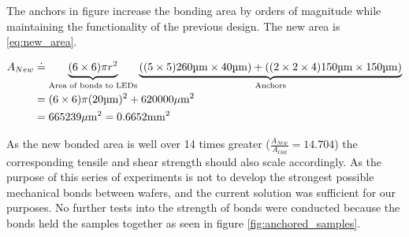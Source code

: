 The anchors in figure increase the bonding area by orders of magnitude while maintaining the functionality of the previous design.
The new area is \ref{eq:new_area}.


\begin{equation} \label{eq:new_area}
    \begin{split}
        A_{New} &\doteq \underbrace{(6\times 6) \pi r^2}_{\text{Area of bonds to LEDs}} \underbrace{((5\times 5) 260\um \times 40\um) + ((2\times 2 \times 4) 150\um \times 150 \um)}_{\text{Anchors}} \\
        &= (6\times 6) \pi (20 \um)^2  + 620000 \umm \\
        &= 665239 \umm = 0.6652 \mm^2
    \end{split}
\end{equation}

As the new bonded area is well over 14 times greater ($ \frac{A_{New}}{A_{Old}} = 14.704$) the corresponding tensile and shear strength should also scale accordingly.
As the purpose of this series of experiments is not to develop the strongest possible mechanical bonds between wafers, and the current solution was sufficient for our purposes. No further tests into the strength of bonds were conducted because the bonds held the samples together as seen in figure \ref{fig:anchored_samples}.


